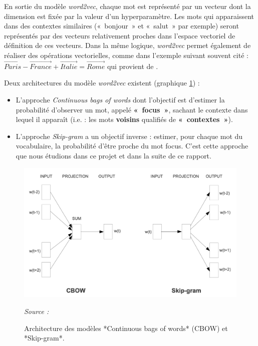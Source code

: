 \documentclass[11pt,french,french]{article}
\begin{document}
En sortie du modèle \emph{word2vec}, chaque mot est représenté par un
vecteur dont la dimension est fixée par la valeur d'un hyperparamètre.
Les mots qui apparaissent dans des contextes similaires («~bonjour~» et
«~salut~» par exemple) seront représentés par des vecteurs relativement
proches dans l'espace vectoriel de définition de ces vecteurs. Dans la
même logique, \emph{word2vec} permet également de réaliser des
opérations vectorielles, comme dans l'exemple suivant souvent cité :
\(\overrightarrow{Paris} - \overrightarrow{France} + \overrightarrow{Italie} = \overrightarrow{Rome}\)
qui provient de \cite{Mikolov}.

Deux architectures du modèle \emph{word2vec} existent (graphique
\ref{fig:cbowskipgram}) :

\begin{itemize}
\item
  L'approche \emph{Continuous bags of words} dont l'objectif est
  d'estimer la probabilité d'observer un mot, appelé \textbf{«~focus~»},
  sachant le contexte dans lequel il apparaît (i.e. : les mots
  \textbf{voisins} qualifiés de \textbf{«~contextes~»}).
\item
  L'approche \emph{Skip-gram} a un objectif inverse : estimer, pour
  chaque mot du vocabulaire, la probabilité d'être proche du mot focus.
  C'est cette approche que nous étudions dans ce projet et dans la suite
  de ce rapport. 
\end{itemize}

\begin{figure}[htp]
\begin{center}
\includegraphics[width=.6\textwidth]{img/cbow_skip_gram.png}
\end{center}
\captionsetup{margin=0cm,format=hang,justification=justified}
\caption{Architecture des modèles *Continuous bags of words* (CBOW) et *Skip-gram*.}\label{fig:cbowskipgram}
\footnotesize
\emph{Source : \cite{Mikolov}}
\end{figure}
\end{document}
